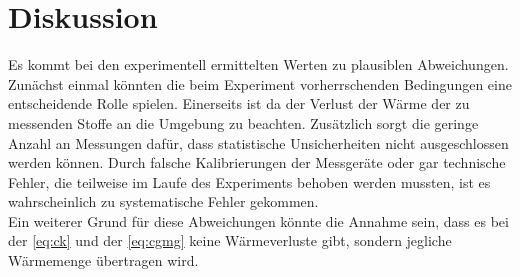 \section{Diskussion}
\label{sec:Diskussion}

Es kommt bei den experimentell ermittelten Werten zu plausiblen Abweichungen.
Zunächst einmal könnten die beim Experiment vorherrschenden Bedingungen eine entscheidende Rolle spielen. 
Einerseits ist da der Verlust der Wärme der zu messenden Stoffe an die Umgebung zu beachten. 
Zusätzlich sorgt die geringe Anzahl an Messungen dafür, dass statistische Unsicherheiten nicht ausgeschlossen werden können. 
Durch falsche Kalibrierungen der Messgeräte oder gar technische Fehler, die teilweise im Laufe des Experiments behoben werden mussten, ist es wahrscheinlich zu systematische Fehler gekommen.\\
Ein weiterer Grund für diese Abweichungen könnte die Annahme sein, dass es bei der \autoref{eq:ck} und der \autoref{eq:cgmg} keine Wärmeverluste gibt, sondern jegliche Wärmemenge übertragen wird. 